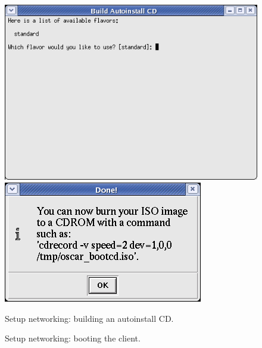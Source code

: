 \begin{figure}[!ht]
  \begin{center}
    \centerline{
      \includegraphics[scale=\imgscale]{figs/6ba_sbs-autoinstall-flpy1}
      \hspace{\imghskip}
      \includegraphics[scale=\imgscale]{figs/6ba_sbs-autoinstall-flpy2}
      }
    \caption{Setup networking: building an autoinstall CD.}
    \label{fig:sbs-autoinstall-flpy1}
  \end{center}
\end{figure}


\begin{figure}[!ht]
  \begin{center}
    \centerline{
      }
    \caption{Setup networking: booting the client.}
    \label{fig:sbs-collect-boot1}
  \end{center}
\end{figure}

